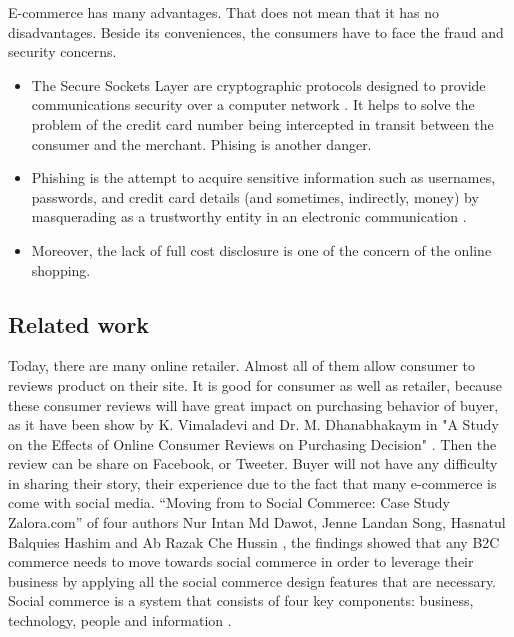 \documentclass[conference]{IEEEtran}
\begin{document}
E-commerce has many advantages. That does not mean that it has no disadvantages. Beside its conveniences, the consumers have to face the fraud and security concerns.

\begin{itemize}
\item The Secure Sockets Layer are cryptographic protocols designed to provide communications security over a computer network \cite{dierks2008transport}. It helps to solve the problem of the credit card number being intercepted in transit between the consumer and the merchant. Phising is another danger.
\item Phishing is the attempt to acquire sensitive information such as usernames, passwords, and credit card details (and sometimes, indirectly, money) by masquerading as a trustworthy entity in an electronic communication \cite{ramzan2010phishing} \cite{van2005characteristics}.
\item Moreover, the lack of full cost disclosure is one of the concern of the online shopping.

\end{itemize}


\subsection{Related work}

Today, there are many online retailer. Almost all of them allow consumer to reviews product on their site. It is good for consumer as well as retailer, because these consumer reviews will have great impact on purchasing behavior of buyer, as it have been show by K. Vimaladevi and Dr. M. Dhanabhakaym in "A Study on the Effects of Online Consumer Reviews on Purchasing Decision" \cite{vimaladevi2012study}. Then the review can be share on Facebook, or Tweeter. Buyer will not have any difficulty in sharing their story, their experience due to the fact that many e-commerce is come with social media. “Moving from  to Social Commerce: Case Study Zalora.com”  of four authors Nur Intan Md Dawot, Jenne Landan Song, Hasnatul Balquies Hashim and Ab Razak Che Hussin \cite{dawotmoving}, the findings showed that any B2C commerce needs to move towards social commerce in order to leverage their business by applying all the social commerce design features that are necessary. Social commerce is a system that consists of four key components: business, technology, people and information \cite{zhou2013social}.


\end{document}
